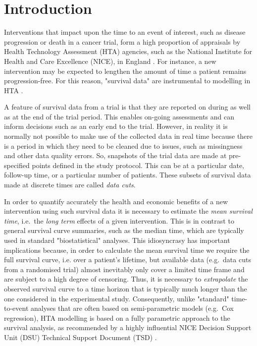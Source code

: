 \documentclass[AMA,STIX1COL]{WileyNJD-v2}
\begin{document}

\section{Introduction}\label{sec:intro}
Interventions that impact upon the time to an event of interest, such as disease progression or death in a cancer trial, form a high proportion of appraisals by Health Technology Assessment (HTA) agencies, such as the National Institute for Health and Care Excellence (NICE), in England \citep{Latimer2011}.
For instance, a new intervention may be expected to lengthen the amount of time a patient remains progression-free. For this reason, "survival data" are instrumental to modelling in HTA \cite{Demiris2006, Jackson2010}.

A feature of survival data from a trial is that they are reported on during as well as at the end of the trial period.
This enables on-going assessments and can inform decisions such as an early end to the trial.
However, in reality it is normally not possible to make use of the collected data in real time because there is a period in which they need to be cleaned due to issues, such as missingness and other data quality errors.
So, snapshots of the trial data are made at pre-specified points defined in the study protocol.
This can be at a particular date, follow-up time, or a particular number of patients.
These subsets of survival data made at discrete times are called \textit{data cuts}.

In order to quantify accurately the health and economic benefits of a new intervention using such survival data it is necessary to estimate the {\it mean survival time}, i.e.~the \textit{long term} effects of a given intervention.
This is in contrast to general survival curve summaries, such as the median time, which are typically used in standard "biostatistical" analyses.
This idiosyncrasy has important implications because, in order to calculate the mean survival time we require the full survival curve, i.e. over a patient's lifetime, but available data (e.g.~data cuts from a randomised trial) almost inevitably only cover a limited time frame and are subject to a high degree of censoring.
Thus, it is necessary to \textit{extrapolate} the observed survival curve to a time horizon that is typically much longer than the one considered in the experimental study.
Consequently, unlike "standard" time-to-event analyses that are often based on semi-parametric models (e.g.~Cox regression), HTA modelling is based on a fully parametric approach to the survival analysis, as recommended by a highly influential NICE Decision Support Unit (DSU) Technical Support Document (TSD) \citep{Latimer2011}.
\end{document}
